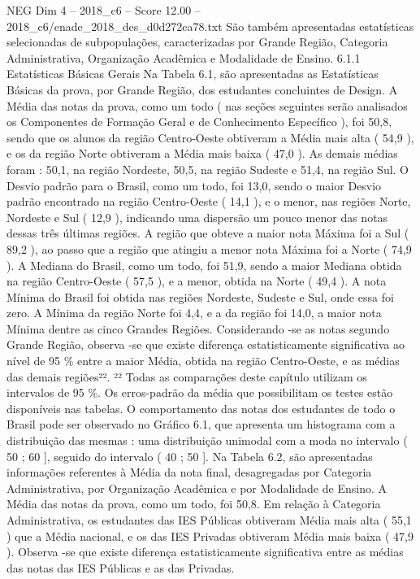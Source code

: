 \begin{textsample}{NEG Dim 4 – 2018\_c6 – Score 12.00 – 2018\_c6/enade\_2018\_des\_d0d272ca78.txt}
São também apresentadas estatísticas selecionadas de subpopulações, caracterizadas por Grande Região, Categoria Administrativa, Organização Acadêmica e Modalidade de Ensino. 6.1.1 Estatísticas Básicas Gerais Na Tabela 6.1, são apresentadas as Estatísticas Básicas da prova, por Grande Região, dos estudantes concluintes de Design.
A Média das notas da prova, como um todo ( nas seções seguintes serão analisados os Componentes de Formação Geral e de Conhecimento Específico ), foi 50,8, sendo que os alunos da região Centro-Oeste obtiveram a Média mais alta ( 54,9 ), e os da região Norte obtiveram a Média mais baixa ( 47,0 ).
As demais médias foram : 50,1, na região Nordeste, 50,5, na região Sudeste e 51,4, na região Sul.
O Desvio padrão para o Brasil, como um todo, foi 13,0, sendo o maior Desvio padrão encontrado na região Centro-Oeste ( 14,1 ), e o menor, nas regiões Norte, Nordeste e Sul ( 12,9 ), indicando uma dispersão um pouco menor das notas dessas três últimas regiões.
A região que obteve a maior nota Máxima foi a Sul ( 89,2 ), ao passo que a região que atingiu a menor nota Máxima foi a Norte ( 74,9 ).
A Mediana do Brasil, como um todo, foi 51,9, sendo a maior Mediana obtida na região Centro-Oeste ( 57,5 ), e a menor, obtida na Norte ( 49,4 ).
A nota Mínima do Brasil foi obtida nas regiões Nordeste, Sudeste e Sul, onde essa foi zero.
A Mínima da região Norte foi 4,4, e a da região foi 14,0, a maior nota Mínima dentre as cinco Grandes Regiões.
Considerando -se as notas segundo Grande Região, observa -se que existe diferença estatisticamente significativa ao nível de 95 \% entre a maior Média, obtida na região Centro-Oeste, e as médias das demais regiões²². ²² Todas as comparações deste capítulo utilizam os intervalos de 95 \%.
Os erros-padrão da média que possibilitam os testes estão disponíveis nas tabelas.
O comportamento das notas dos estudantes de todo o Brasil pode ser observado no Gráfico 6.1, que apresenta um histograma com a distribuição das mesmas : uma distribuição unimodal com a moda no intervalo ( 50 ; 60 ], seguido do intervalo ( 40 ; 50 ].
Na Tabela 6.2, são apresentadas informações referentes à Média da nota final, desagregadas por Categoria Administrativa, por Organização Acadêmica e por Modalidade de Ensino.
A Média das notas da prova, como um todo, foi 50,8.
Em relação à Categoria Administrativa, os estudantes das IES Públicas obtiveram Média mais alta ( 55,1 ) que a Média nacional, e os das IES Privadas obtiveram Média mais baixa ( 47,9 ).
Observa -se que existe diferença estatisticamente significativa entre as médias das notas das IES Públicas e as das Privadas.

\end{textsample}
